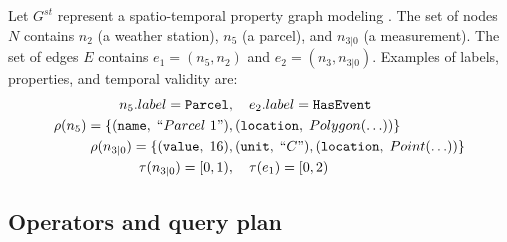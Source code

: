 \begin{example}
Let $G^{st}$ represent a spatio-temporal property graph modeling .
The set of nodes $N$ contains $n_2$ (a weather station), $n_5$ (a parcel), and $n_{3|0}$ (a measurement).
The set of edges $E$ contains $e_1 = (n_5, n_2)$ and $e_2 = (n_3, n_{3|0})$.
Examples of labels, properties, and temporal validity are:
\[
\begin{aligned}
n_5.label = \texttt{Parcel}&,\quad e_2.label = \texttt{HasEvent}\\
\rho(n_5) = \{(\texttt{name},\;``Parcel~1")&,(\texttt{location},\;Polygon(\ldots))\}\\
\rho(n_{3|0}) = \{(\texttt{value},\;16)&,(\texttt{unit},\;``C"),(\texttt{location},\;Point(\ldots))\}\\
\tau(n_{3|0}) = [0,1)&,\quad \tau(e_1)= [0,2)
\end{aligned}\]
\end{example}

\subsection{Operators and query plan}



